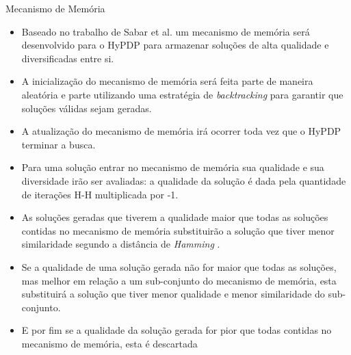\begin{frame}[allowframebreaks]{Mecanismo de Memória}	
	
	\begin{itemize}
		\item Baseado no trabalho de Sabar et al. \cite{sabar2015automatic} um mecanismo de memória será desenvolvido para o HyPDP para armazenar soluções de alta qualidade e diversificadas entre si.
		\item A inicialização do mecanismo de memória será feita parte de maneira aleatória e parte utilizando uma estratégia de \textit{backtracking} para garantir que soluções válidas sejam geradas.
		\item A atualização do mecanismo de memória irá ocorrer toda vez que o HyPDP terminar a busca. 
		\item Para uma solução entrar no mecanismo de memória sua qualidade e sua diversidade irão ser avaliadas: a qualidade da solução é dada pela quantidade de iterações H-H multiplicada por -1.
		\item  As soluções geradas que tiverem a qualidade maior que todas as soluções contidas no mecanismo de memória substituirão a solução que tiver menor similaridade segundo a distância de \textit{Hamming} \cite{hamming1950error}.
		\item Se a qualidade de uma solução gerada não for maior que todas as soluções, mas melhor em relação a um sub-conjunto do mecanismo de memória, esta substituirá a solução que tiver menor qualidade e menor similaridade do sub-conjunto.
		\item E
		por fim se a qualidade da solução gerada for pior que todas contidas no mecanismo de
		memória, esta é descartada
		
			
	\end{itemize}
	
\end{frame}



